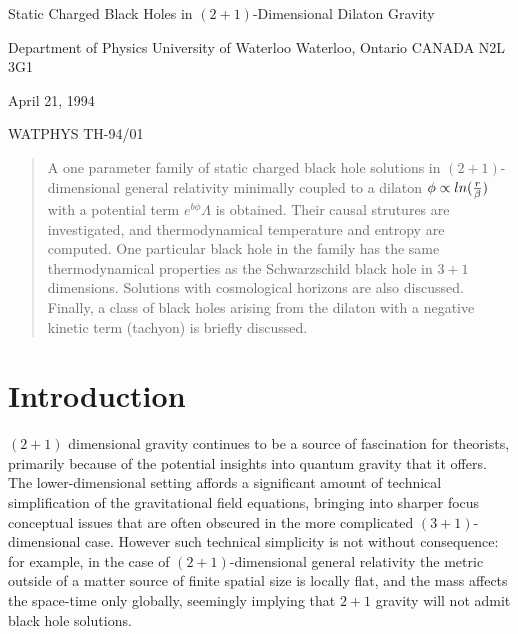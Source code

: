 
%
\begin{title}
Static Charged Black Holes in $(2+1)$-Dimensional Dilaton Gravity
\end{title}
%
\author{K.C.K. Chan and R.B. Mann}
%
\begin{instit}
	Department of Physics
	University of Waterloo
	Waterloo, Ontario
	CANADA N2L 3G1
\end{instit}
%
\begin{center}April 21, 1994\end{center}
\begin{center}{WATPHYS TH-94/01}\end{center}

\begin{abstract}
A one parameter family of static charged black hole solutions in
$(2+1)$-dimensional general relativity minimally coupled to a dilaton
$\phi\propto ln({r\over\beta})$ with a potential
term $e^{b\phi}\Lambda$ is obtained.
Their causal strutures are investigated, and
thermodynamical temperature and entropy are computed. One
particular black hole in the family has the same thermodynamical
properties as the Schwarzschild black hole in $3+1$ dimensions.
Solutions with cosmological horizons are also discussed. Finally,
a class of black holes arising from the dilaton with
a negative kinetic term (tachyon) is briefly discussed.

\end{abstract}

\section{Introduction}

$(2+1)$ dimensional gravity continues to be a source of fascination
for theorists, primarily because of the potential insights
into quantum gravity that it offers. The lower-dimensional setting affords
a significant amount of technical simplification of the gravitational field
equations, bringing into sharper focus conceptual issues that are often
obscured in the more complicated $(3+1)$-dimensional case. However such
technical simplicity is not without consequence: for example, in the case
of $(2+1)$-dimensional general relativity the metric outside of a matter
source of finite spatial size is locally flat, and the mass affects the
space-time only globally, seemingly implying that $2+1$ gravity will not
admit black hole solutions.

